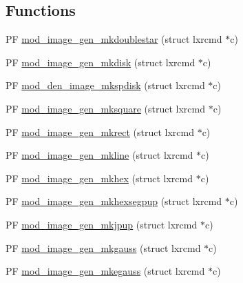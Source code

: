 \subsection*{Functions}
\begin{DoxyCompactItemize}
\item 
P\+F \hyperlink{PIAACMCdesign_2src_2image__gen_2image__gen-util_8c_ae711902bde27e26dc070bda9087c1628}{mod\+\_\+image\+\_\+gen\+\_\+mkdoublestar} (struct lxrcmd $\ast$c)
\item 
P\+F \hyperlink{PIAACMCdesign_2src_2image__gen_2image__gen-util_8c_a3d80af29d0752bc59a85d13fd3acc09c}{mod\+\_\+image\+\_\+gen\+\_\+mkdisk} (struct lxrcmd $\ast$c)
\item 
P\+F \hyperlink{PIAACMCdesign_2src_2image__gen_2image__gen-util_8c_aa3f0614861b90486ed8450153d073633}{mod\+\_\+den\+\_\+image\+\_\+mkspdisk} (struct lxrcmd $\ast$c)
\item 
P\+F \hyperlink{PIAACMCdesign_2src_2image__gen_2image__gen-util_8c_a07f8ed2e7bbf4a7fd8bf4445148304ee}{mod\+\_\+image\+\_\+gen\+\_\+mksquare} (struct lxrcmd $\ast$c)
\item 
P\+F \hyperlink{PIAACMCdesign_2src_2image__gen_2image__gen-util_8c_a72b25a6d62a1c60cae1a47a6322eac92}{mod\+\_\+image\+\_\+gen\+\_\+mkrect} (struct lxrcmd $\ast$c)
\item 
P\+F \hyperlink{PIAACMCdesign_2src_2image__gen_2image__gen-util_8c_abea55b6781ae9f67de79dc5282057c6a}{mod\+\_\+image\+\_\+gen\+\_\+mkline} (struct lxrcmd $\ast$c)
\item 
P\+F \hyperlink{PIAACMCdesign_2src_2image__gen_2image__gen-util_8c_a20cbf717cff48a21b32b329d75957208}{mod\+\_\+image\+\_\+gen\+\_\+mkhex} (struct lxrcmd $\ast$c)
\item 
P\+F \hyperlink{PIAACMCdesign_2src_2image__gen_2image__gen-util_8c_adfa79e5d577753c71ba0fd2230c63d42}{mod\+\_\+image\+\_\+gen\+\_\+mkhexsegpup} (struct lxrcmd $\ast$c)
\item 
P\+F \hyperlink{PIAACMCdesign_2src_2image__gen_2image__gen-util_8c_aa8ccdbd620046813b2eff887fa6d06ac}{mod\+\_\+image\+\_\+gen\+\_\+mkjpup} (struct lxrcmd $\ast$c)
\item 
P\+F \hyperlink{PIAACMCdesign_2src_2image__gen_2image__gen-util_8c_a3ce403061bd5d2d1671a3cb28daa8662}{mod\+\_\+image\+\_\+gen\+\_\+mkgauss} (struct lxrcmd $\ast$c)
\item 
P\+F \hyperlink{PIAACMCdesign_2src_2image__gen_2image__gen-util_8c_a5212fcc463c8f1c9dc689b1f0b35f905}{mod\+\_\+image\+\_\+gen\+\_\+mkegauss} (struct lxrcmd $\ast$c)
\item 

\end{DoxyCompactItemize}
